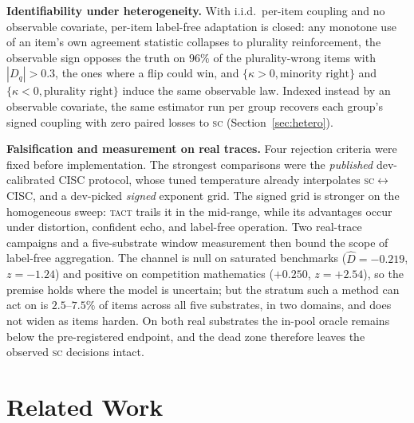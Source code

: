 \documentclass{article}
\newcommand{\Dhat}{\widehat{D}}
\newcommand{\SC}{\textsc{sc}}
\newcommand{\TACT}{\textsc{tact}}
\begin{document}
\textbf{Identifiability under heterogeneity.} With i.i.d.\
per-item coupling and no observable covariate, per-item label-free adaptation
is closed: any monotone use of an item's own agreement statistic collapses to
plurality reinforcement, the observable sign opposes the truth on $96\%$ of
the plurality-wrong items with $|D_q|>0.3$, the ones where a flip could win, and
$\{\kappa>0,\text{minority right}\}$ and $\{\kappa<0,\text{plurality right}\}$
induce the same observable law. Indexed instead by an observable covariate,
the same estimator run per group recovers each group's signed coupling with
zero paired losses to \SC{} (Section~\ref{sec:hetero}).

\textbf{Falsification and measurement on real traces.} Four rejection criteria
were fixed before implementation. The strongest comparisons were the
\emph{published} dev-calibrated CISC protocol, whose tuned temperature already
interpolates \SC$\leftrightarrow$CISC, and a dev-picked \emph{signed} exponent
grid. The signed grid is stronger on the homogeneous sweep: \TACT{} trails it
in the mid-range, while its advantages occur under distortion, confident echo,
and label-free operation. Two real-trace campaigns and a five-substrate window
measurement then bound the scope of label-free aggregation. The channel is null on saturated
benchmarks ($\Dhat=-0.219$, $z=-1.24$) and positive on competition
mathematics ($+0.250$, $z=+2.54$), so the premise holds where the model is
uncertain; but the stratum such a method can act on is $2.5$--$7.5\%$ of items
across all five substrates, in two domains, and does not widen as items
harden.
On both real substrates the in-pool oracle remains below the pre-registered
endpoint, and the dead zone therefore leaves the observed \SC{} decisions intact.

\section{Related Work}\label{sec:related}
\end{document}
